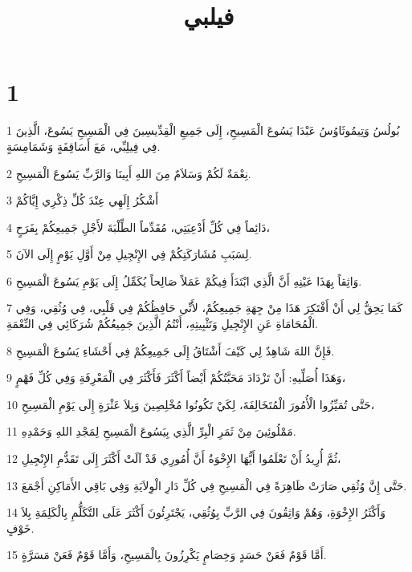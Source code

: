 

\title{فيلبي}


\chapter{1}

\par 1 بُولُسُ وَتِيمُوثَاوُسُ عَبْدَا يَسُوعَ الْمَسِيحِ، إِلَى جَمِيعِ الْقِدِّيسِينَ فِي الْمَسِيحِ يَسُوعَ، الَّذِينَ فِي فِيلِبِّي، مَعَ أَسَاقِفَةٍ وَشَمَامِسَةٍ.
\par 2 نِعْمَةٌ لَكُمْ وَسَلاَمٌ مِنَ اللهِ أَبِينَا وَالرَّبِّ يَسُوعَ الْمَسِيحِ.
\par 3 أَشْكُرُ إِلَهِي عِنْدَ كُلِّ ذِكْرِي إِيَّاكُمْ
\par 4 دَائِماً فِي كُلِّ أَدْعِيَتِي، مُقَدِّماً الطِّلْبَةَ لأَجْلِ جَمِيعِكُمْ بِفَرَحٍ،
\par 5 لِسَبَبِ مُشَارَكَتِكُمْ فِي الإِنْجِيلِ مِنْ أَوَّلِ يَوْمٍ إِلَى الآنَ.
\par 6 وَاثِقاً بِهَذَا عَيْنِهِ أَنَّ الَّذِي ابْتَدَأَ فِيكُمْ عَمَلاً صَالِحاً يُكَمِّلُ إِلَى يَوْمِ يَسُوعَ الْمَسِيحِ.
\par 7 كَمَا يَحِقُّ لِي أَنْ أَفْتَكِرَ هَذَا مِنْ جِهَةِ جَمِيعِكُمْ، لأَنِّي حَافِظُكُمْ فِي قَلْبِي، فِي وُثُقِي، وَفِي الْمُحَامَاةِ عَنِ الإِنْجِيلِ وَتَثْبِيتِهِ، أَنْتُمُ الَّذِينَ جَمِيعُكُمْ شُرَكَائِي فِي النِّعْمَةِ.
\par 8 فَإِنَّ اللهَ شَاهِدٌ لِي كَيْفَ أَشْتَاقُ إِلَى جَمِيعِكُمْ فِي أَحْشَاءِ يَسُوعَ الْمَسِيحِ.
\par 9 وَهَذَا أُصَلِّيهِ: أَنْ تَزْدَادَ مَحَبَّتُكُمْ أَيْضاً أَكْثَرَ فَأَكْثَرَ فِي الْمَعْرِفَةِ وَفِي كُلِّ فَهْمٍ،
\par 10 حَتَّى تُمَيِّزُوا الْأُمُورَ الْمُتَخَالِفَةَ، لِكَيْ تَكُونُوا مُخْلِصِينَ وَبِلاَ عَثْرَةٍ إِلَى يَوْمِ الْمَسِيحِ،
\par 11 مَمْلُوئِينَ مِنْ ثَمَرِ الْبِرِّ الَّذِي بِيَسُوعَ الْمَسِيحِ لِمَجْدِ اللهِ وَحَمْدِهِ.
\par 12 ثُمَّ أُرِيدُ أَنْ تَعْلَمُوا أَيُّهَا الإِخْوَةُ أَنَّ أُمُورِي قَدْ آلَتْ أَكْثَرَ إِلَى تَقَدُّمِ الإِنْجِيلِ،
\par 13 حَتَّى إِنَّ وُثُقِي صَارَتْ ظَاهِرَةً فِي الْمَسِيحِ فِي كُلِّ دَارِ الْوِلاَيَةِ وَفِي بَاقِي الأَمَاكِنِ أَجْمَعَ.
\par 14 وَأَكْثَرُ الإِخْوَةِ، وَهُمْ وَاثِقُونَ فِي الرَّبِّ بِوُثُقِي، يَجْتَرِئُونَ أَكْثَرَ عَلَى التَّكَلُّمِ بِالْكَلِمَةِ بِلاَ خَوْفٍ.
\par 15 أَمَّا قَوْمٌ فَعَنْ حَسَدٍ وَخِصَامٍ يَكْرِزُونَ بِالْمَسِيحِ، وَأَمَّا قَوْمٌ فَعَنْ مَسَرَّةٍ.
